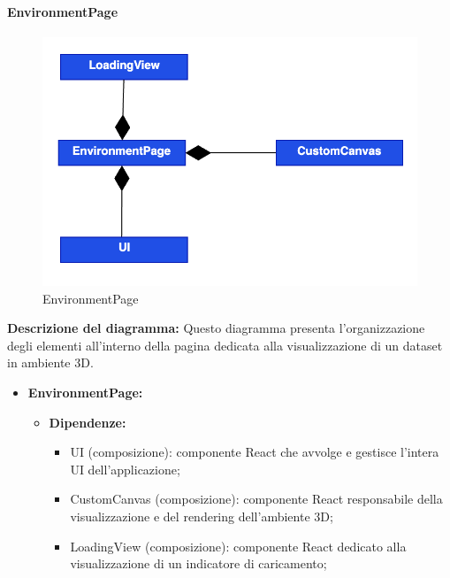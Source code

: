 \paragraph{EnvironmentPage}
\begin{figure}[h!] \centering
      \includegraphics[scale=0.6]{template/images/uml_front/ui/EnvironmentPage.png}
      \caption{EnvironmentPage}
\end{figure}
\textbf{Descrizione del diagramma:}
Questo diagramma presenta l'organizzazione degli elementi all'interno della pagina dedicata alla visualizzazione di un dataset in ambiente 3D.
\begin{itemize}
      \item \textbf{EnvironmentPage:}
            \begin{itemize}
                  \item \textbf{Dipendenze:}
                        \begin{itemize}
                              \item UI (composizione): componente React che avvolge e gestisce l'intera UI
                                    dell'applicazione;
                              \item CustomCanvas (composizione): componente React responsabile della
                                    visualizzazione e del rendering dell'ambiente 3D;
                              \item LoadingView (composizione): componente React dedicato alla visualizzazione di un indicatore di
                                    caricamento;
                        \end{itemize}
            \end{itemize}
\end{itemize}

